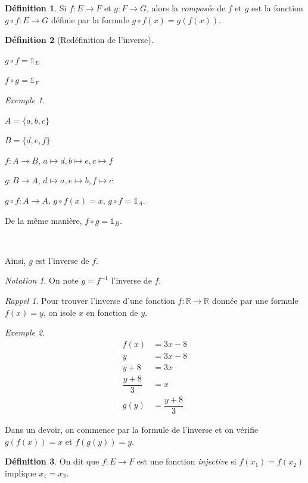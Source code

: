 \documentclass{report}
\newcommand*{\reels}{\mathbb{R}}
\newcommand*{\identite}{\mathds{1}}
\theoremstyle{definition}
\newtheorem*{defin}{D\'efinition}
\theoremstyle{remark}
\newtheorem*{exem}{Exemple}
\newtheorem*{nota}{Notation}
\newtheorem*{rappel}{Rappel}
\begin{document}
	\begin{defin}
		Si $f:E \to F$ et $g:F \to G$, alors la \emph{compos\'ee} de $f$ et $g$ est la fonction $g \circ f:E \to G$ d\'efinie par la formule $g \circ f(x)=g(f(x))$.
	\end{defin}

	\begin{defin}[Red\'efinition de l'inverse]~

		$g \circ f=\identite_E$

		$f \circ g=\identite_F$
	\end{defin}

	\begin{exem}~

		$A=\{a,b,c\}$

		$B=\{d,e,f\}$

		$f:A \to B$, $a \mapsto d, b \mapsto e, c \mapsto f$

		$g:B \to A$, $d \mapsto a, e \mapsto b, f \mapsto c$

		$g \circ f:A \to A$, $g \circ f(x)=x$, $g \circ f=\identite_A$.

		De la m\^eme mani\`ere, $f \circ g=\identite_B$.

		~

		Ainsi, $g$ est l'inverse de $f$.
	\end{exem}

	\begin{nota}
		On note $g=f^{-1}$ l'inverse de $f$.
	\end{nota}


	\begin{rappel}
		Pour trouver l'inverse d'une fonction $f:\reels \to \reels$ donn\'ee par une formule $f(x)=y$, on isole $x$ en fonction de $y$.
	\end{rappel}


	\begin{exem}
		\begin{align*}
			f(x)&= 3x-8\\
			y&= 3x-8\\
			y+8&= 3x\\
			\dfrac{y+8}{3}&= x\\
			g(y)&= \dfrac{y+8}{3}
		\end{align*}

		Dans un devoir, on commence par la formule de l'inverse et on v\'erifie $g(f(x))=x$ et $f(g(y))=y$.
	\end{exem}

	\begin{defin}
		On dit que $f:E \to F$ est une fonction \emph{injective} si $f(x_1)=f(x_2)$ implique $x_1=x_2$.
	\end{defin}
\end{document}
